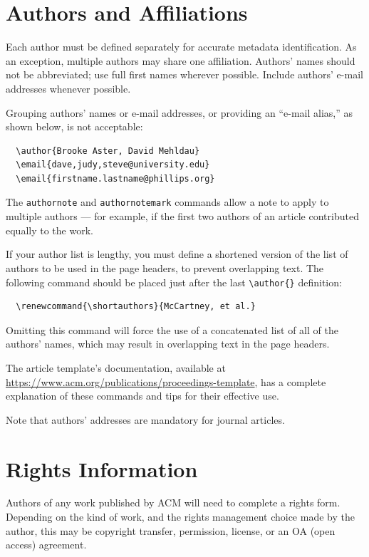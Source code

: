 \documentclass[sigconf]{acmart}
\begin{document}
\section{Authors and Affiliations}

Each author must be defined separately for accurate metadata
identification.  As an exception, multiple authors may share one
affiliation. Authors' names should not be abbreviated; use full first
names wherever possible. Include authors' e-mail addresses whenever
possible.

Grouping authors' names or e-mail addresses, or providing an ``e-mail
alias,'' as shown below, is not acceptable:
\begin{verbatim}
  \author{Brooke Aster, David Mehldau}
  \email{dave,judy,steve@university.edu}
  \email{firstname.lastname@phillips.org}
\end{verbatim}

The \verb|authornote| and \verb|authornotemark| commands allow a note
to apply to multiple authors --- for example, if the first two authors
of an article contributed equally to the work.

If your author list is lengthy, you must define a shortened version of
the list of authors to be used in the page headers, to prevent
overlapping text. The following command should be placed just after
the last \verb|\author{}| definition:
\begin{verbatim}
  \renewcommand{\shortauthors}{McCartney, et al.}
\end{verbatim}
Omitting this command will force the use of a concatenated list of all
of the authors' names, which may result in overlapping text in the
page headers.

The article template's documentation, available at
\url{https://www.acm.org/publications/proceedings-template}, has a
complete explanation of these commands and tips for their effective
use.

Note that authors' addresses are mandatory for journal articles.

\section{Rights Information}

Authors of any work published by ACM will need to complete a rights
form. Depending on the kind of work, and the rights management choice
made by the author, this may be copyright transfer, permission,
license, or an OA (open access) agreement.
\end{document}
